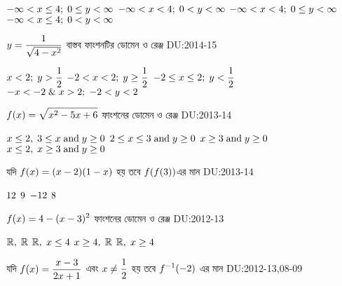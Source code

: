 \documentclass[addpoints]{exam}
\begin{document}
\begin{questions}
\begin{oneparchoices}
 \choice $\mathlarger{-\infty<x \le 4;\; 0\le y < \infty}$
 \choice $\mathlarger{-\infty<x < 4;\; 0< y < \infty}$
 \choice $\mathlarger{-\infty<x < 4;\; 0\le y < \infty}$
 \choice $\mathlarger{-\infty<x \le 4;\; 0< y < \infty}$
\end{oneparchoices}

\question $\mathlarger{y=\frac{1}{\sqrt{4-x^{2}}}}$ বাস্তব ফাংশনটির ডোমেন ও রেঞ্জ \hfill \textsc{DU:2014-15}

\begin{oneparchoices}
 \choice $\mathlarger{x<2;\; y>\frac{1}{2}}$
 \choice $\mathlarger{-2<x < 2;\; y \ge \frac{1}{2}}$
\choice $\mathlarger{-2 \le x \le 2;\; y < \frac{1}{2}}$
 \choice $\mathlarger{-x< -2\;\& \;  x>2;\; -2< y < 2}$
\end{oneparchoices}

\question $\mathlarger{f(x)=\sqrt{x^{2}-5x+6}}$ ফাংশনের ডোমেন ও রেঞ্জ    \hfill \textsc{DU:2013-14}

\begin{oneparchoices}
 \choice $\mathlarger{x \le 2,\; 3\le x\;\text{and}\; y \ge 0}$
 \choice $\mathlarger{2\le x \le 3\;\text{and}\;  y \ge 0}$
 \choice $\mathlarger{ x \ge 3\;\text{and}\;  y \ge 0}$
 \choice $\mathlarger{x \le 2,\; x\ge 3\;\text{and}\; y \ge 0}$
\end{oneparchoices}

\question যদি $\mathlarger{f(x)=(x-2)(1-x)}$ হয় তবে $\mathlarger{f(f(3))}$এর মান  \hfill \textsc{DU:2013-14}

\begin{oneparchoices}
 \choice $\mathlarger{12}$
 \choice $\mathlarger{9}$
 \choice $\mathlarger{ -12}$
 \choice $\mathlarger{8}$
\end{oneparchoices}

\question $\mathlarger{f(x)=4-(x-3)^{2}}$ ফাংশনের ডোমেন ও রেঞ্জ \hfill \textsc{DU:2012-13}

\begin{oneparchoices}
 \choice $\mathlarger{\mathbb{R},\; \mathbb{R} }$
 \hspace*{1.5cm}\choice $\mathlarger{\mathbb{R},\; x\le 4}$
 \choice $x\ge 4,\; \mathlarger{\mathbb{R}}$
 \hspace*{.93cm}\choice $\mathlarger{\mathbb{R},\; x\ge 4}$
\end{oneparchoices}

\question যদি $\mathlarger{f(x)=\frac{x-3}{2x+1}}$ এবং $\mathlarger{x \neq \frac{1}{2}}$ হয় তবে $\mathlarger{f^{-1}(-2)}$  এর মান   \hfill \textsc{DU:2012-13,08-09}


\end{questions}
\end{document}
